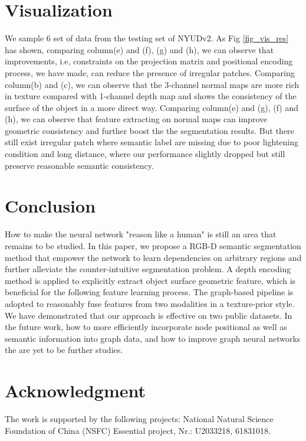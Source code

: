 ﻿\documentclass[journal]{IEEEtran}
\begin{document}
    \section{Visualization}
    We sample 6 set of data from the testing set of NYUDv2. As Fig \ref{fig_vis_res}
    has shown, comparing column(e) and (f), (g) and (h), we can observe that improvements, i.e, constraints on the projection matrix and positional
    encoding process, we have made, can reduce the presence of irregular patches. Comparing column(b) and (c), we can observe that the 3-channel normal maps are more rich in texture compared with 1-channel depth map and shows the consistency of the surface of the object in a more direct way. Comparing column(e) and (g), (f) and (h), we can observe that feature extracting on normal maps can improve geometric consistency and further boost the the segmentation results. But there still exist irregular patch where semantic label are missing due to poor lightening condition and long distance, where our performance slightly dropped but still preserve reasonable semantic consistency.


    
\section{Conclusion}
    How to make the neural network "reason like a human" is still an area that remains to be studied. In this paper, we propose a RGB-D semantic segmentation method that empower the network to learn dependencies on arbitrary regions and further alleviate the counter-intuitive segmentation problem. A depth encoding method is applied to explicitly extract object surface geometric feature, which is beneficial for the following feature learning process. The graph-based pipeline is adopted to reasonably fuse features from two modalities in a texture-prior style. We have demonstrated that our approach is effective on two public datasets. In the future work, how to more efficiently incorporate node positional as well as semantic information into graph data, and how to improve graph neural networks the are yet to be further studies.

\section*{Acknowledgment}
    The work is supported by the following projects: National Natural Science Foundation of China (NSFC) Essential project, Nr.: U2033218, 61831018.
 

% 


\end{document}
